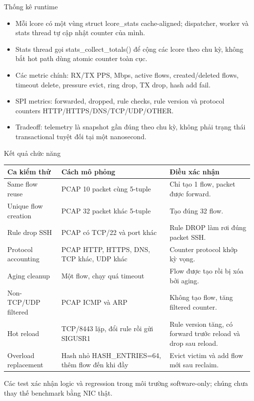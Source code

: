 \documentclass[aspectratio=169]{beamer}
\DeclareRobustCommand{\code}[1]{{\scriptsize\ttfamily #1}}
\begin{document}
\begin{frame}{Thống kê runtime}
\small
\begin{itemize}
    \item Mỗi lcore có một vùng \code{struct lcore\_stats} cache-aligned; dispatcher, worker và stats thread tự cập nhật counter của mình.
    \item Stats thread gọi \code{stats\_collect\_totals()} để cộng các lcore theo chu kỳ, không bắt hot path dùng atomic counter toàn cục.
    \item Các metric chính: RX/TX PPS, Mbps, active flows, created/deleted flows, timeout delete, pressure evict, ring drop, TX drop, hash add fail.
    \item SPI metrics: forwarded, dropped, rule checks, rule version và protocol counters HTTP/HTTPS/DNS/TCP/UDP/OTHER.
    \item Tradeoff: telemetry là snapshot gần đúng theo chu kỳ, không phải trạng thái transactional tuyệt đối tại một nanosecond.
\end{itemize}
\end{frame}

\begin{frame}{Kết quả chức năng}
\scriptsize
\begin{tabularx}{\textwidth}{|L{2.8cm}|Y|Y|}
\hline
\textbf{Ca kiểm thử} & \textbf{Cách mô phỏng} & \textbf{Điều xác nhận} \\
\hline
Same flow reuse & PCAP 10 packet cùng 5-tuple & Chỉ tạo 1 flow, packet được forward. \\
\hline
Unique flow creation & PCAP 32 packet khác 5-tuple & Tạo đúng 32 flow. \\
\hline
Rule drop SSH & PCAP có TCP/22 và port khác & Rule DROP làm rơi đúng packet SSH. \\
\hline
Protocol accounting & PCAP HTTP, HTTPS, DNS, TCP khác, UDP khác & Counter protocol khớp kỳ vọng. \\
\hline
Aging cleanup & Một flow, chạy quá timeout & Flow được tạo rồi bị xóa bởi aging. \\
\hline
Non-TCP/UDP filtered & PCAP ICMP và ARP & Không tạo flow, tăng filtered counter. \\
\hline
Hot reload & TCP/8443 lặp, đổi rule rồi gửi \code{SIGUSR1} & Rule version tăng, có forward trước reload và drop sau reload. \\
\hline
Overload replacement & Hash nhỏ \code{HASH\_ENTRIES=64}, thêm flow đến khi đầy & Evict victim và add flow mới sau reclaim. \\
\hline
\end{tabularx}

\vspace{0.15cm}
\footnotesize
Các test xác nhận logic và regression trong môi trường software-only; chúng chưa thay thế benchmark bằng NIC thật.
\end{frame}
\end{document}
